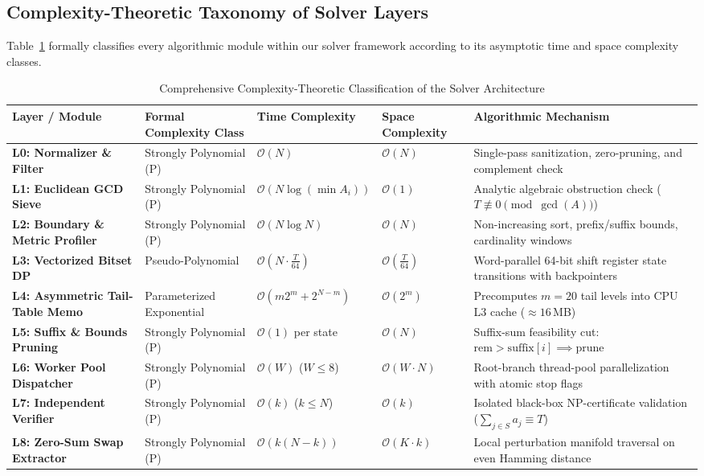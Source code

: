 \documentclass[journal,onecolumn,11pt]{IEEEtran}
\begin{document}
\subsection{Complexity-Theoretic Taxonomy of Solver Layers}
Table~\ref{tab:taxonomy} formally classifies every algorithmic module within our solver framework according to its asymptotic time and space complexity classes.

\begin{table}[t]
\centering
\caption{Comprehensive Complexity-Theoretic Classification of the Solver Architecture}
\label{tab:taxonomy}
\renewcommand{\arraystretch}{1.25}
\begin{tabular}{lllll}
\hline
\textbf{Layer / Module} & \textbf{Formal Complexity Class} & \textbf{Time Complexity} & \textbf{Space Complexity} & \textbf{Algorithmic Mechanism} \\
\hline
\textbf{L0: Normalizer \& Filter} & Strongly Polynomial ($\text{P}$) & $\mathcal{O}(N)$ & $\mathcal{O}(N)$ & Single-pass sanitization, zero-pruning, and complement check \\
\textbf{L1: Euclidean GCD Sieve} & Strongly Polynomial ($\text{P}$) & $\mathcal{O}(N \log(\min A_i))$ & $\mathcal{O}(1)$ & Analytic algebraic obstruction check ($T \not\equiv 0 \pmod{\gcd(A)}$) \\
\textbf{L2: Boundary \& Metric Profiler} & Strongly Polynomial ($\text{P}$) & $\mathcal{O}(N \log N)$ & $\mathcal{O}(N)$ & Non-increasing sort, prefix/suffix bounds, cardinality windows \\
\textbf{L3: Vectorized Bitset DP} & Pseudo-Polynomial & $\mathcal{O}\left(N \cdot \frac{T}{64}\right)$ & $\mathcal{O}\left(\frac{T}{64}\right)$ & Word-parallel 64-bit shift register state transitions with backpointers \\
\textbf{L4: Asymmetric Tail-Table Memo} & Parameterized Exponential & $\mathcal{O}\left(m 2^m + 2^{N-m}\right)$ & $\mathcal{O}\left(2^m\right)$ & Precomputes $m=20$ tail levels into CPU L3 cache ($\approx 16$\,MB) \\
\textbf{L5: Suffix \& Bounds Pruning} & Strongly Polynomial ($\text{P}$) & $\mathcal{O}(1)$ per state & $\mathcal{O}(N)$ & Suffix-sum feasibility cut: $\text{rem} > \text{suffix}[i] \implies \text{prune}$ \\
\textbf{L6: Worker Pool Dispatcher} & Strongly Polynomial ($\text{P}$) & $\mathcal{O}(W)$ ($W \le 8$) & $\mathcal{O}(W \cdot N)$ & Root-branch thread-pool parallelization with atomic stop flags \\
\textbf{L7: Independent Verifier} & Strongly Polynomial ($\text{P}$) & $\mathcal{O}(k)$ ($k \le N$) & $\mathcal{O}(k)$ & Isolated black-box NP-certificate validation ($\sum_{j \in S} a_j \equiv T$) \\
\textbf{L8: Zero-Sum Swap Extractor} & Strongly Polynomial ($\text{P}$) & $\mathcal{O}\left(k(N - k)\right)$ & $\mathcal{O}(K \cdot k)$ & Local perturbation manifold traversal on even Hamming distance \\
\hline
\end{tabular}
\end{table}
\end{document}
